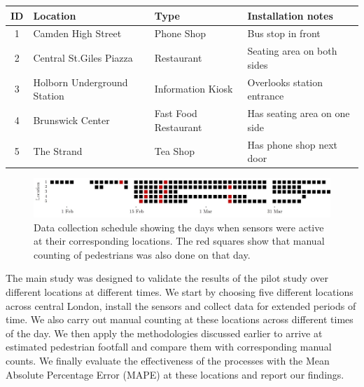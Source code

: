 \begin{table}
	{\begin{tabular}{clll} 
		\toprule
		 ID & Location & Type & Installation notes\\
		 \midrule
		 1 & Camden High Street & Phone Shop & Bus stop in front\\
		 2 & Central St.Giles Piazza & Restaurant & Seating area on both sides\\
		 3 & Holborn Underground Station & Information Kiosk & Overlooks station entrance\\
		 4 & Brunswick Center & Fast Food Restaurant & Has seating area on one side\\
		 5 & The Strand & Tea Shop & Has phone shop next door \\
		 \bottomrule
	\end{tabular}}
	\label{locations-table}
\end{table}

\begin{figure}
	\begin{center}
		\includegraphics [width=0.90\linewidth] {images/main_schedule.jpeg}
		\caption{Data collection schedule showing the days when sensors were active at their corresponding locations. The red squares show that manual counting of pedestrians was also done on that day.}
		\label{main_schedule}
	\end{center}
\end{figure}

The main study was designed to validate the results of the pilot study over different locations at different times. We start by choosing five different locations across central London, install the sensors and collect data for extended periods of time. 
We also carry out manual counting at these locations across different times of the day. 
We then apply the methodologies discussed earlier to arrive at estimated pedestrian footfall and compare them with corresponding manual counts.
We finally evaluate the effectiveness of the processes with the Mean Absolute Percentage Error (MAPE) at these locations and report our findings.

